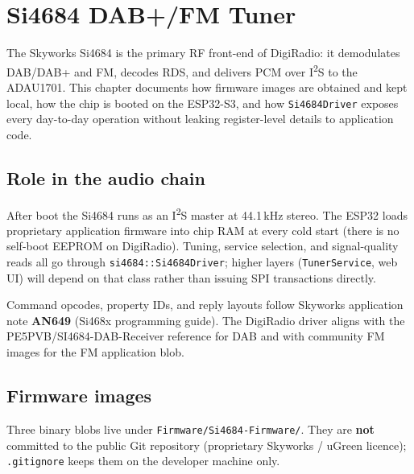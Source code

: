 
\chapter{Si4684 DAB+/FM Tuner}
\label{ch:si4684}

The Skyworks Si4684 is the primary RF front-end of DigiRadio: it demodulates
DAB/DAB+ and FM, decodes RDS, and delivers PCM over I\textsuperscript{2}S to
the ADAU1701. This chapter documents how firmware images are obtained and kept
local, how the chip is booted on the ESP32-S3, and how \texttt{Si4684Driver}
exposes every day-to-day operation without leaking register-level details to
application code.

\section{Role in the audio chain}
\label{sec:si4684-role}

After boot the Si4684 runs as an I\textsuperscript{2}S master at
44.1\,kHz stereo. The ESP32 loads proprietary application firmware into chip
RAM at every cold start (there is no self-boot EEPROM on DigiRadio). Tuning,
service selection, and signal-quality reads all go through
\texttt{si4684::Si4684Driver}; higher layers (\texttt{TunerService}, web UI)
will depend on that class rather than issuing SPI transactions directly.

\begin{drref}
Command opcodes, property IDs, and reply layouts follow Skyworks application
note \textbf{AN649} (Si468x programming guide). The DigiRadio driver aligns
with the PE5PVB/SI4684-DAB-Receiver reference for DAB and with community FM
images for the FM application blob.
\end{drref}

\section{Firmware images}
\label{sec:si4684-firmware}

Three binary blobs live under \texttt{Firmware/Si4684-Firmware/}. They are
\textbf{not} committed to the public Git repository (proprietary Skyworks /
uGreen licence); \texttt{.gitignore} keeps them on the developer machine only.

